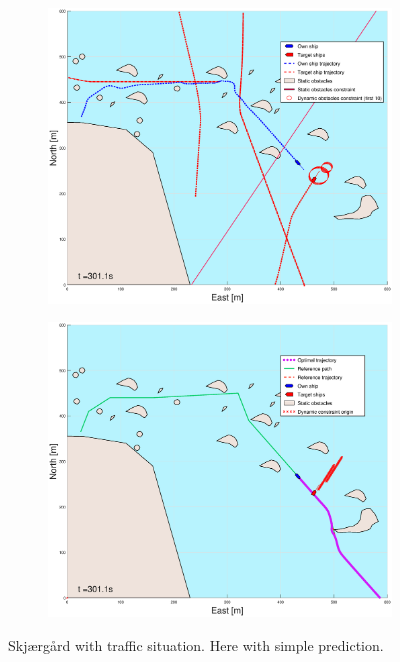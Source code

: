 \begin{figure}[ht]
\begin{subfigure}[b]{0.499\textwidth}
    \end{subfigure}
    \hfill
    \\
    \begin{subfigure}[b]{0.49\textwidth}
        \centering
        \includegraphics[width=\textwidth]{Images/Figures/skjergard_m_trafikk_NEW/_Simple_1fig1_time=301}
    \end{subfigure}
    \hfill
    \begin{subfigure}[b]{0.499\textwidth}
        \centering
        \includegraphics[width=\textwidth]{Images/Figures/skjergard_m_trafikk_NEW/_Simple_1fig999_time=301}
    \end{subfigure}
    \hfill
    \caption{Skjærgård with traffic situation. Here with simple prediction.}
\end{figure}

